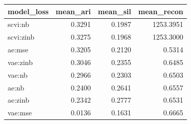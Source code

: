 \begin{tabular}{lrrr}
\toprule
model\_loss & mean\_ari & mean\_sil & mean\_recon \\
\midrule
scvi:nb & 0.3291 & 0.1987 & 1253.3951 \\
scvi:zinb & 0.3275 & 0.1968 & 1253.3000 \\
ae:mse & 0.3205 & 0.2120 & 0.5314 \\
vae:zinb & 0.3046 & 0.2355 & 0.6485 \\
vae:nb & 0.2966 & 0.2303 & 0.6503 \\
ae:nb & 0.2400 & 0.2641 & 0.6557 \\
ae:zinb & 0.2342 & 0.2777 & 0.6531 \\
vae:mse & 0.0136 & 0.1631 & 0.6665 \\
\bottomrule
\end{tabular}
